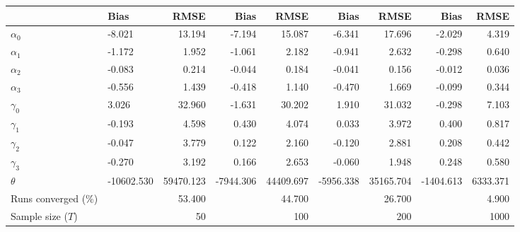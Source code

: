 
\begin{tabular}[t]{llrrrrrrr}
\toprule
  & Bias & RMSE & Bias & RMSE & Bias & RMSE & Bias & RMSE\\
\midrule
$\alpha_{0}$ & -8.021 & 13.194 & -7.194 & 15.087 & -6.341 & 17.696 & -2.029 & 4.319\\
$\alpha_{1}$ & -1.172 & 1.952 & -1.061 & 2.182 & -0.941 & 2.632 & -0.298 & 0.640\\
$\alpha_{2}$ & -0.083 & 0.214 & -0.044 & 0.184 & -0.041 & 0.156 & -0.012 & 0.036\\
$\alpha_{3}$ & -0.556 & 1.439 & -0.418 & 1.140 & -0.470 & 1.669 & -0.099 & 0.344\\
$\gamma_{0}$ & 3.026 & 32.960 & -1.631 & 30.202 & 1.910 & 31.032 & -0.298 & 7.103\\
$\gamma_{1}$ & -0.193 & 4.598 & 0.430 & 4.074 & 0.033 & 3.972 & 0.400 & 0.817\\
$\gamma_{2}$ & -0.047 & 3.779 & 0.122 & 2.160 & -0.120 & 2.881 & 0.208 & 0.442\\
$\gamma_{3}$ & -0.270 & 3.192 & 0.166 & 2.653 & -0.060 & 1.948 & 0.248 & 0.580\\
$\theta$ & -10602.530 & 59470.123 & -7944.306 & 44409.697 & -5956.338 & 35165.704 & -1404.613 & 6333.371\\
Runs converged (\%) &  & 53.400 &  & 44.700 &  & 26.700 &  & 4.900\\
Sample size ($T$) &  & 50 &  & 100 &  & 200 &  & 1000\\
\bottomrule
\end{tabular}
